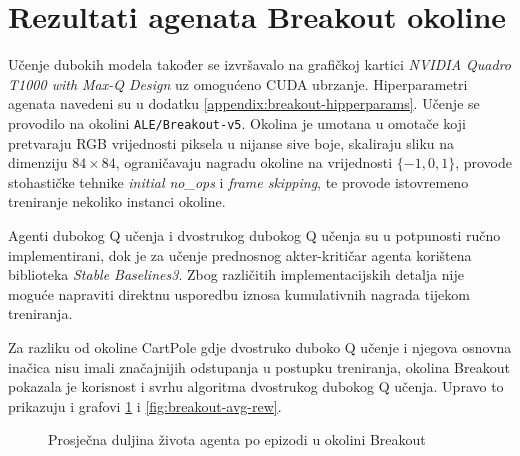 \section{Rezultati agenata Breakout okoline}

Učenje dubokih modela također se izvršavalo na grafičkoj kartici \textit{NVIDIA Quadro T1000 with Max-Q Design} uz omogućeno CUDA ubrzanje. Hiperparametri agenata navedeni su u dodatku \ref{appendix:breakout-hipperparams}. Učenje se provodilo na okolini \texttt{ALE/Breakout-v5}. Okolina je umotana u omotače koji pretvaraju RGB vrijednosti piksela u nijanse sive boje, skaliraju sliku na dimenziju $84 \times 84$, ograničavaju nagradu okoline na vrijednosti $\{-1, 0, 1\}$, provode stohastičke tehnike \textit{initial no_ops} i \textit{frame skipping}, te provode istovremeno treniranje nekoliko instanci okoline.

Agenti dubokog Q učenja i dvostrukog dubokog Q učenja su u potpunosti ručno implementirani, dok je za učenje prednosnog akter-kritičar agenta korištena biblioteka \textit{Stable Baselines3}. Zbog različitih implementacijskih detalja nije moguće napraviti direktnu usporedbu iznosa kumulativnih nagrada tijekom treniranja. 

Za razliku od okoline CartPole gdje dvostruko duboko Q učenje i njegova osnovna inačica nisu imali značajnijih odstupanja u postupku treniranja, okolina Breakout pokazala je korisnost i svrhu algoritma dvostrukog dubokog Q učenja. Upravo to prikazuju i grafovi \ref{fig:breakout-avg-ep-len} i \ref{fig:breakout-avg-rew}.

\begin{figure}[H]
    \centering
    \caption{Prosječna duljina života agenta po epizodi u okolini Breakout}
    \label{fig:breakout-avg-ep-len}
\end{figure}

